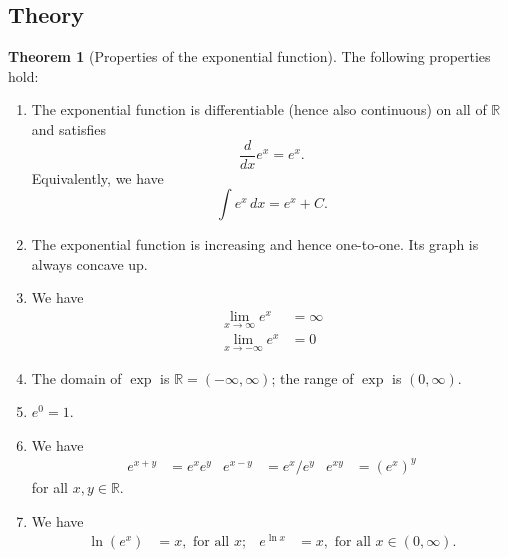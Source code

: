 \documentclass[11pt]{article}
\theoremstyle{definition}
\theoremstyle{named}
\newtheorem*{namedtheorem}{Theorem}
\numberwithin{myalgctr}{section}
\begin{document}
 \subsection*{Theory}
\begin{namedtheorem}[Properties of the exponential function]
  The following properties hold:
  \begin{enumerate}[itemsep=0pt,topsep=0pt]
    \item The exponential function is differentiable (hence also continuous) on all of $\mathbb{R}$ and satisfies
    \[
    \frac{d}{dx}e^x=e^x.
    \]
    Equivalently, we have
    \[
    \int e^x\, dx=e^x+C.
    \]
    \item The exponential function is increasing and hence one-to-one. Its graph is always concave up.
    \item We have
    \begin{align*}
      \lim_{x\to\infty}e^x&=\infty\\
      \lim_{x\to -\infty}e^x&=0
    \end{align*}
    \item The domain of $\exp$ is $\mathbb{R}=(-\infty, \infty)$; the range of $\exp$ is $(0,\infty)$.
    \item $e^0=1$.
    \item We have
    \begin{align*}
      e^{x+y}&=e^xe^y &
      e^{x-y}&=e^x/e^y &
      e^{xy}&=(e^x)^y
    \end{align*}
    for all $x,y\in\mathbb{R}$.
    \item We have
    \begin{align*}
      \ln(e^x)&=x, \text{ for all $x$}; &
      e^{\ln x}&=x, \text{ for all $x\in (0,\infty)$.}
    \end{align*}
  \end{enumerate}
\end{namedtheorem}
\end{document}
